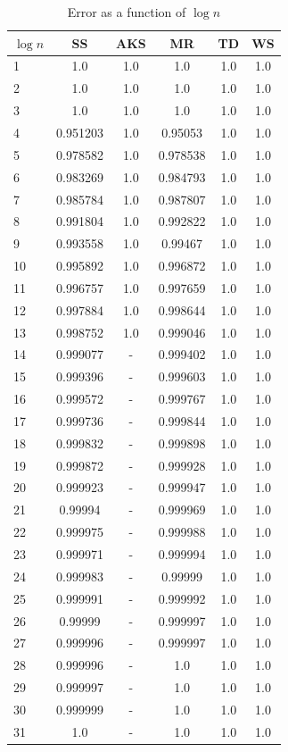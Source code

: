 \begin{table}
    \centering
    \caption{Error as a function of $\log n$}
    \begin{tabular}{|l|c|c|c|c|c|} \hline
        $\log n$ & SS & AKS & MR & TD & WS \\
        \hline
1 & 1.0 & 1.0 & 1.0 & 1.0 & 1.0 \\
2 & 1.0 & 1.0 & 1.0 & 1.0 & 1.0 \\
3 & 1.0 & 1.0 & 1.0 & 1.0 & 1.0 \\
4 & 0.951203 & 1.0 & 0.95053 & 1.0 & 1.0 \\
5 & 0.978582 & 1.0 & 0.978538 & 1.0 & 1.0 \\
6 & 0.983269 & 1.0 & 0.984793 & 1.0 & 1.0 \\
7 & 0.985784 & 1.0 & 0.987807 & 1.0 & 1.0 \\
8 & 0.991804 & 1.0 & 0.992822 & 1.0 & 1.0 \\
9 & 0.993558 & 1.0 & 0.99467 & 1.0 & 1.0 \\
10& 0.995892 & 1.0 & 0.996872 & 1.0 & 1.0 \\
11& 0.996757 & 1.0 & 0.997659 & 1.0 & 1.0 \\
12& 0.997884 & 1.0 & 0.998644 & 1.0 & 1.0 \\
13& 0.998752 & 1.0 & 0.999046 & 1.0 & 1.0 \\
14& 0.999077 & - & 0.999402 & 1.0 & 1.0 \\
15& 0.999396 & - & 0.999603 & 1.0 & 1.0 \\
16& 0.999572 & - & 0.999767 & 1.0 & 1.0 \\
17& 0.999736 & - & 0.999844 & 1.0 & 1.0 \\
18& 0.999832 & - & 0.999898 & 1.0 & 1.0 \\
19& 0.999872 & - & 0.999928 & 1.0 & 1.0 \\
20& 0.999923 & - & 0.999947 & 1.0 & 1.0 \\
21& 0.99994 & - & 0.999969 & 1.0 & 1.0 \\
22& 0.999975 & - & 0.999988 & 1.0 & 1.0 \\
23& 0.999971 & - & 0.999994 & 1.0 & 1.0 \\
24& 0.999983 & - & 0.99999 & 1.0 & 1.0 \\
25& 0.999991 & - & 0.999992 & 1.0 & 1.0 \\
26& 0.99999 & - & 0.999997 & 1.0 & 1.0 \\
27& 0.999996 & - & 0.999997 & 1.0 & 1.0 \\
28& 0.999996 & - & 1.0 & 1.0 & 1.0 \\
29& 0.999997 & - & 1.0 & 1.0 & 1.0 \\
30& 0.999999 & - & 1.0 & 1.0 & 1.0 \\
31& 1.0 & - & 1.0 & 1.0 & 1.0 \\
        \hline
    \end{tabular}
\end{table}

